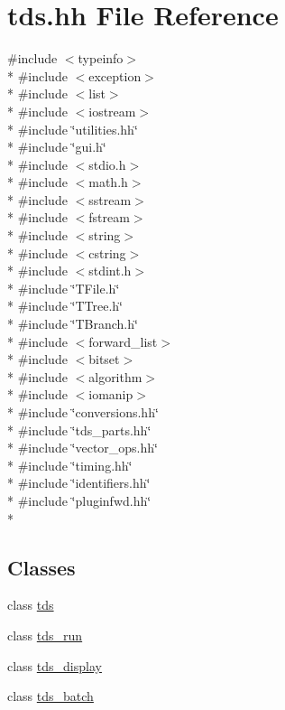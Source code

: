 \hypertarget{tds_8hh}{\section{tds.\-hh File Reference}
\label{tds_8hh}
}
{\ttfamily \#include $<$typeinfo$>$}\\*
{\ttfamily \#include $<$exception$>$}\\*
{\ttfamily \#include $<$list$>$}\\*
{\ttfamily \#include $<$iostream$>$}\\*
{\ttfamily \#include \char`\"{}utilities.\-hh\char`\"{}}\\*
{\ttfamily \#include \char`\"{}gui.\-h\char`\"{}}\\*
{\ttfamily \#include $<$stdio.\-h$>$}\\*
{\ttfamily \#include $<$math.\-h$>$}\\*
{\ttfamily \#include $<$sstream$>$}\\*
{\ttfamily \#include $<$fstream$>$}\\*
{\ttfamily \#include $<$string$>$}\\*
{\ttfamily \#include $<$cstring$>$}\\*
{\ttfamily \#include $<$stdint.\-h$>$}\\*
{\ttfamily \#include \char`\"{}T\-File.\-h\char`\"{}}\\*
{\ttfamily \#include \char`\"{}T\-Tree.\-h\char`\"{}}\\*
{\ttfamily \#include \char`\"{}T\-Branch.\-h\char`\"{}}\\*
{\ttfamily \#include $<$forward\-\_\-list$>$}\\*
{\ttfamily \#include $<$bitset$>$}\\*
{\ttfamily \#include $<$algorithm$>$}\\*
{\ttfamily \#include $<$iomanip$>$}\\*
{\ttfamily \#include \char`\"{}conversions.\-hh\char`\"{}}\\*
{\ttfamily \#include \char`\"{}tds\-\_\-parts.\-hh\char`\"{}}\\*
{\ttfamily \#include \char`\"{}vector\-\_\-ops.\-hh\char`\"{}}\\*
{\ttfamily \#include \char`\"{}timing.\-hh\char`\"{}}\\*
{\ttfamily \#include \char`\"{}identifiers.\-hh\char`\"{}}\\*
{\ttfamily \#include \char`\"{}pluginfwd.\-hh\char`\"{}}\\*
\subsection*{Classes}
\begin{DoxyCompactItemize}
\item 
class \hyperlink{classtds}{tds}
\item 
class \hyperlink{classtds__run}{tds\-\_\-run}
\item 
class \hyperlink{classtds__display}{tds\-\_\-display}
\item 
class \hyperlink{classtds__batch}{tds\-\_\-batch}
\end{DoxyCompactItemize}
